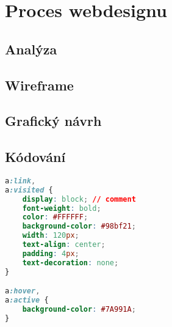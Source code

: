 \chapter{Proces webdesignu}

\blindtext

\section{Analýza}
\blindtext

\section{Wireframe}
\blindtext

\section{Grafický návrh}
\blindtext

\section{Kódování}
\blindtext

\begin{lstlisting}[language=css]
a:link,
a:visited {
    display: block; // comment
    font-weight: bold;
    color: #FFFFFF;
    background-color: #98bf21;
    width: 120px;
    text-align: center;
    padding: 4px;
    text-decoration: none;
}

a:hover,
a:active {
    background-color: #7A991A;
}
\end{lstlisting}
